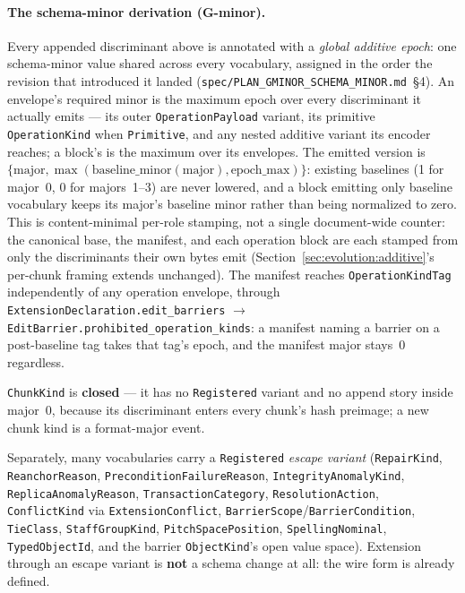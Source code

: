 \documentclass[11pt,letterpaper]{report}
\newcommand{\tablenums}[1]{{\addfontfeatures{Numbers={Lining,Tabular}}#1}}
\begin{document}
\paragraph{The schema-minor derivation (G-minor).} Every appended
discriminant above is annotated with a \emph{global additive epoch}: one
schema-minor value shared across every vocabulary, assigned in the order the
revision that introduced it landed
(\texttt{spec/PLAN\_GMINOR\_SCHEMA\_MINOR.md}~\S4). An envelope's required
minor is the maximum epoch over every discriminant it actually emits --- its
outer \texttt{OperationPayload} variant, its primitive \texttt{OperationKind}
when \texttt{Primitive}, and any nested additive variant its encoder reaches;
a block's is the maximum over its envelopes. The emitted version is
$\{\text{major}, \max(\text{baseline\_minor}(\text{major}),
\text{epoch\_max})\}$: existing baselines (\tablenums{1} for major~0,
\tablenums{0} for majors~1--3) are never lowered, and a block emitting only
baseline vocabulary keeps its major's baseline minor rather than being
normalized to zero. This is content-minimal per-role stamping, not a single
document-wide counter: the canonical base, the manifest, and each operation
block are each stamped from only the discriminants their own bytes emit
(Section~\ref{sec:evolution:additive}'s per-chunk framing extends
unchanged). The manifest reaches \texttt{OperationKindTag} independently of
any operation envelope, through
\texttt{ExtensionDeclaration.edit\_barriers} $\to$
\texttt{EditBarrier.prohibited\_operation\_kinds}: a manifest naming a
barrier on a post-baseline tag takes that tag's epoch, and the manifest
major stays~0 regardless.

\texttt{ChunkKind} is \textbf{closed} --- it has no \texttt{Registered}
variant and no append story inside major~0, because its discriminant enters
every chunk's hash preimage; a new chunk kind is a format-major event.

Separately, many vocabularies carry a \texttt{Registered} \emph{escape
variant} (\texttt{RepairKind}, \texttt{ReanchorReason},
\texttt{PreconditionFailureReason}, \texttt{IntegrityAnomalyKind},
\texttt{ReplicaAnomalyReason}, \texttt{TransactionCategory},
\texttt{ResolutionAction}, \texttt{ConflictKind} via
\texttt{ExtensionConflict}, \texttt{BarrierScope}/\texttt{BarrierCondition},
\texttt{TieClass}, \texttt{StaffGroupKind}, \texttt{PitchSpacePosition},
\texttt{SpellingNominal}, \texttt{TypedObjectId}, and the barrier
\texttt{ObjectKind}'s open value space). Extension through an escape variant
is \textbf{not} a schema change at all: the wire form is already defined.
\end{document}
